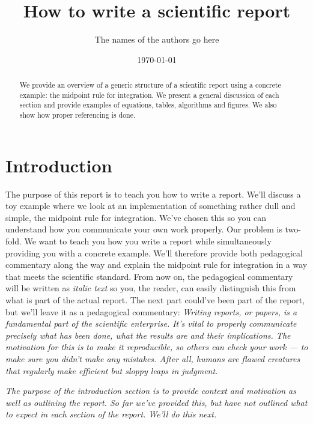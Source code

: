 \documentclass[english,notitlepage, reprint]{revtex4-1}  %
\begin{document}
\title{How to write a scientific report}      %
\author{The names of the authors go here}          %
\date{\today}                             %
\noaffiliation                            %

\begin{abstract}
	We provide an overview of a generic structure of a scientific report using a concrete example: the midpoint rule for integration. We present a general discussion of each section and provide examples of equations, tables, algorithms and figures. We also show how proper referencing is done.
\end{abstract}
\maketitle

\section{Introduction}
The purpose of this report is to teach you how to write a report. We'll discuss a toy example where we look at an implementation of something rather dull and simple, the midpoint rule for integration. We've chosen this so you can understand how you communicate your own work properly. Our problem is two-fold. We want to teach you how you write a report while simultaneously providing you with a concrete example. We'll therefore provide both pedagogical commentary along the way and explain the midpoint rule for integration in a way that meets the scientific standard. From now on, the pedagogical commentary will be written as \textit{italic text} so you, the reader, can easily distinguish this from what is part of the actual report. The next part could've been part of the report, but we'll leave it as a pedagogical commentary:
\textit{Writing reports, or papers, is a fundamental part of the scientific enterprise. It's vital to properly communicate precisely what has been done, what the results are and their implications. The motivation for this is to make it reproducible, so others can check your work --- to make sure you didn't make any mistakes. After all, humans are flawed creatures that regularly make efficient but sloppy leaps in judgment.}

\textit{The purpose of the introduction section is to provide context and motivation as well as outlining the report. So far we've provided this, but have not outlined what to expect in each section of the report. We'll do this next.}
\end{document}
